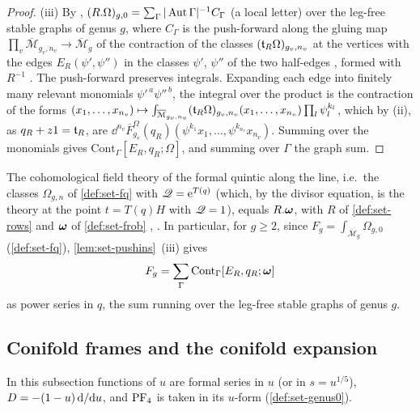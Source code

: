 \begin{proof}
(iii) By \cite[Defs.~2.2, 2.13]{PPZ15}, $(R.\Omega)_{g,0}=\sum_\Gamma|\operatorname{Aut}\Gamma|^{-1}C_\Gamma$ (a local letter) over the leg-free stable graphs of genus $g$, where $C_\Gamma$ is the push-forward along the gluing map $\prod_v\overline{\mathcal M}_{g_v,n_v}\to\overline{\mathcal M}_g$ \cite[\S0.2, (1)]{PPZ15} of the contraction of the classes $(\mathfrak{t}_R\Omega)_{g_v,n_v}$ at the vertices with the edges $E_R(\psi',\psi'')$ in the classes $\psi'$, $\psi''$ of the two half-edges \cite[Def.~2.2~(iii)]{PPZ15}, formed with $R^{-1}$ \cite[p.~20]{PPZ15}. The push-forward preserves integrals. Expanding each edge into finitely many relevant monomials $\psi'^{\,a}\psi''^{\,b}$, the integral over the product is the contraction of the forms $(x_1,\dots,x_{n_v})\mapsto\int_{\overline{\mathcal M}_{g_v,n_v}}(\mathfrak{t}_R\Omega)_{g_v,n_v}(x_1,\dots,x_{n_v})\prod_l\psi_l^{k_l}$, which by (ii), as $q_R+z1=\mathfrak{t}_R$, are $\dd^{n_v}\overline F^\Omega_{g_v}(q_R)(\psi^{k_1}x_1,\dots,\psi^{k_{n_v}}x_{n_v})$. Summing over the monomials gives $\mathrm{Cont}_\Gamma[E_R,q_R;\Omega]$, and summing over $\Gamma$ the graph sum.
\end{proof}

\begin{thm}
\label{thm:set-GT}
The cohomological field theory of the formal quintic along the line, i.e.\ the classes $\Omega_{g,n}$ of \cref{def:set-fq} with $\mathscr{Q}=\mathrm{e}^{T(q)}$ (which, by the divisor equation, is the theory at the point $t=T(q)H$ with $\mathscr{Q}=1$), equals $R.\boldsymbol{\omega}$, with $R$ of \cref{def:set-rows} and $\boldsymbol{\omega}$ of \cref{def:set-frob} \cite[Theorem~(2) in (1.15)]{MR2917177}, \cite[Section~4.1, Theorem~4.1]{GJR18}. In particular, for $g\geq2$, since $F_g=\int_{\overline{\mathcal M}_g}\Omega_{g,0}$ (\cref{def:set-fq}), \cref{lem:set-pushins}~(iii) gives
\[
F_g=\sum_\Gamma\mathrm{Cont}_\Gamma[E_R,q_R;\boldsymbol{\omega}]
\]
as power series in $q$, the sum running over the leg-free stable graphs of genus $g$.
\end{thm}

\subsection{Conifold frames and the conifold expansion}
\label{sec:set-frames}

In this subsection functions of $u$ are formal series in $u$ (or in $s=u^{1/5}$), $D=-(1-u)\,\mathrm{d}/\mathrm{d} u$, and $\mathrm{PF}_{4}$ is taken in its $u$-form (\cref{def:set-genus0}).

